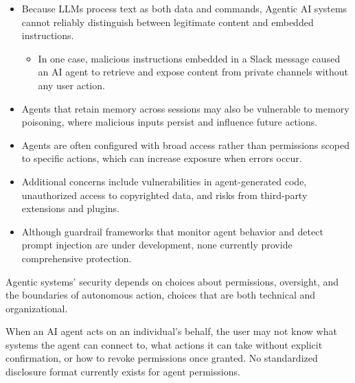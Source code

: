 \documentclass[acmlarge,nonacm,natbib=false]{acmart}
\begin{document}
\begin{techbriefbody}
\begin{itemize}
\item Because LLMs process text as both data and commands, Agentic AI
  systems cannot reliably distinguish between legitimate content and
  embedded instructions.\cite{perez2022ignore}
  \begin{itemize}
  \item In one case, malicious instructions embedded in a Slack message
    caused an AI agent to retrieve and expose content from private
    channels without any user action.\cite{promptarmor2024slack}
  \end{itemize}
\item Agents that retain memory across sessions may also be vulnerable to
  memory poisoning, where malicious inputs persist and influence future
  actions.
\item Agents are often configured with broad access rather than
  permissions scoped to specific actions, which can increase exposure
  when errors occur.
\item Additional concerns include vulnerabilities in agent-generated
  code, unauthorized access to copyrighted data, and risks from
  third-party extensions and plugins.
\item Although guardrail frameworks that monitor agent behavior and
  detect prompt injection are under development, none currently provide
  comprehensive protection.\cite{rebedea2023nemo,chennabasappa2025llamafirewall}
\end{itemize}

\begin{takeaway}[12bp]
Agentic systems' security depends on choices about permissions,
oversight, and the boundaries of autonomous action, choices that are
both technical and organizational.
\end{takeaway}

 When an AI agent acts on
an individual's behalf, the user may not know what systems the agent can
connect to, what actions it can take without explicit confirmation, or
how to revoke permissions once granted. No standardized disclosure format
currently exists for agent permissions.


\end{techbriefbody}
\end{document}
